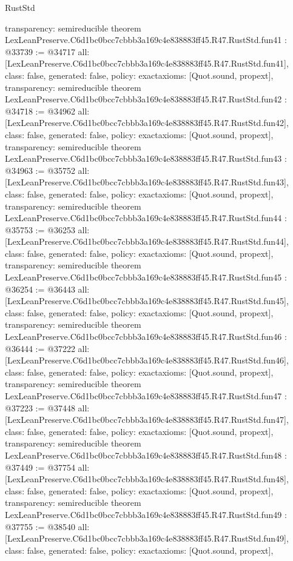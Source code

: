 \begin{lexlean}{RustStd}
\begin{coremodule}
{  transparency: semireducible
}
theorem LexLeanPreserve.C6d1bc0bcc7cbbb3a169c4e838883ff45.R47.RustStd.fun41 : @33739 := @34717 {
  all: [LexLeanPreserve.C6d1bc0bcc7cbbb3a169c4e838883ff45.R47.RustStd.fun41],
  class: false,
  generated: false,
  policy: exact{axioms: [Quot.sound, propext]},
  transparency: semireducible
}
theorem LexLeanPreserve.C6d1bc0bcc7cbbb3a169c4e838883ff45.R47.RustStd.fun42 : @34718 := @34962 {
  all: [LexLeanPreserve.C6d1bc0bcc7cbbb3a169c4e838883ff45.R47.RustStd.fun42],
  class: false,
  generated: false,
  policy: exact{axioms: [Quot.sound, propext]},
  transparency: semireducible
}
theorem LexLeanPreserve.C6d1bc0bcc7cbbb3a169c4e838883ff45.R47.RustStd.fun43 : @34963 := @35752 {
  all: [LexLeanPreserve.C6d1bc0bcc7cbbb3a169c4e838883ff45.R47.RustStd.fun43],
  class: false,
  generated: false,
  policy: exact{axioms: [Quot.sound, propext]},
  transparency: semireducible
}
theorem LexLeanPreserve.C6d1bc0bcc7cbbb3a169c4e838883ff45.R47.RustStd.fun44 : @35753 := @36253 {
  all: [LexLeanPreserve.C6d1bc0bcc7cbbb3a169c4e838883ff45.R47.RustStd.fun44],
  class: false,
  generated: false,
  policy: exact{axioms: [Quot.sound, propext]},
  transparency: semireducible
}
theorem LexLeanPreserve.C6d1bc0bcc7cbbb3a169c4e838883ff45.R47.RustStd.fun45 : @36254 := @36443 {
  all: [LexLeanPreserve.C6d1bc0bcc7cbbb3a169c4e838883ff45.R47.RustStd.fun45],
  class: false,
  generated: false,
  policy: exact{axioms: [Quot.sound, propext]},
  transparency: semireducible
}
theorem LexLeanPreserve.C6d1bc0bcc7cbbb3a169c4e838883ff45.R47.RustStd.fun46 : @36444 := @37222 {
  all: [LexLeanPreserve.C6d1bc0bcc7cbbb3a169c4e838883ff45.R47.RustStd.fun46],
  class: false,
  generated: false,
  policy: exact{axioms: [Quot.sound, propext]},
  transparency: semireducible
}
theorem LexLeanPreserve.C6d1bc0bcc7cbbb3a169c4e838883ff45.R47.RustStd.fun47 : @37223 := @37448 {
  all: [LexLeanPreserve.C6d1bc0bcc7cbbb3a169c4e838883ff45.R47.RustStd.fun47],
  class: false,
  generated: false,
  policy: exact{axioms: [Quot.sound, propext]},
  transparency: semireducible
}
theorem LexLeanPreserve.C6d1bc0bcc7cbbb3a169c4e838883ff45.R47.RustStd.fun48 : @37449 := @37754 {
  all: [LexLeanPreserve.C6d1bc0bcc7cbbb3a169c4e838883ff45.R47.RustStd.fun48],
  class: false,
  generated: false,
  policy: exact{axioms: [Quot.sound, propext]},
  transparency: semireducible
}
theorem LexLeanPreserve.C6d1bc0bcc7cbbb3a169c4e838883ff45.R47.RustStd.fun49 : @37755 := @38540 {
  all: [LexLeanPreserve.C6d1bc0bcc7cbbb3a169c4e838883ff45.R47.RustStd.fun49],
  class: false,
  generated: false,
  policy: exact{axioms: [Quot.sound, propext]},
}
\end{coremodule}
\end{lexlean}
